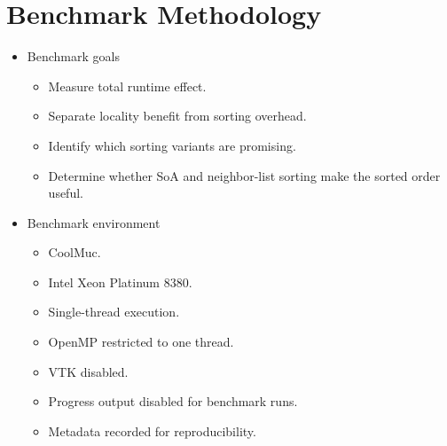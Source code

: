 \chapter{Benchmark Methodology}
\label{ch:benchmark_methodology}

\begin{itemize}
    \item Benchmark goals
    \begin{itemize}
        \item Measure total runtime effect.
        \item Separate locality benefit from sorting overhead.
        \item Identify which sorting variants are promising.
        \item Determine whether SoA and neighbor-list sorting make the sorted order useful.
    \end{itemize}

    \item Benchmark environment
    \begin{itemize}
        \item CoolMuc.
        \item Intel Xeon Platinum 8380.
        \item Single-thread execution.
        \item OpenMP restricted to one thread.
        \item VTK disabled.
        \item Progress output disabled for benchmark runs.
        \item Metadata recorded for reproducibility.
    \end{itemize}


\end{itemize}
